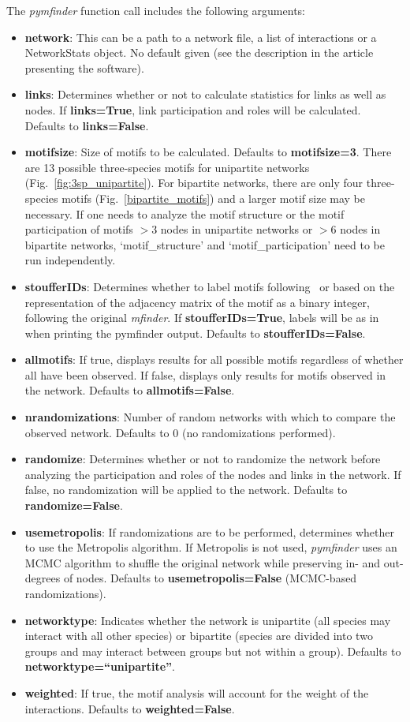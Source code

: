 \documentclass[12pt]{article}
\begin{document}
			The \emph{pymfinder} function call includes the following arguments:
     	\begin{itemize}
     		\item \textbf{network}: This can be a path to a network file, a list of interactions or a NetworkStats object. No default given (see the description in the article presenting the software).
				\item \textbf{links}: Determines whether or not to calculate statistics for links as well as nodes. If \textbf{links=True}, link participation and roles will be calculated. Defaults to \textbf{links=False}.
				\item \textbf{motifsize}: Size of motifs to be calculated. Defaults to \textbf{motifsize=3}. There are 13 possible three-species motifs for unipartite networks (Fig.~\ref{fig:3sp_unipartite}). For bipartite networks, there are only four three-species motifs (Fig.~\ref{bipartite_motifs}) and a larger motif size may be necessary. If one needs to analyze the motif structure or the motif participation of motifs $>3$ nodes in unipartite networks or $>6$ nodes in bipartite networks, `motif\_structure' and `motif\_participation' need to be run independently.
				\item \textbf{stoufferIDs}: Determines whether to label motifs following~\citet{Stouffer2007} or based on the representation of the adjacency matrix of the motif as a binary integer, following the original \emph{mfinder}. If \textbf{stoufferIDs=True}, labels will be as in~\citet{Stouffer2007} when printing the pymfinder output. Defaults to \textbf{stoufferIDs=False}.
				\item \textbf{allmotifs}: If true, displays results for all possible motifs regardless of whether all have been observed. If false, displays only results for motifs observed in the network. Defaults to \textbf{allmotifs=False}.
				\item \textbf{nrandomizations}: Number of random networks with which to compare the observed network. Defaults to 0 (no randomizations performed).
				\item \textbf{randomize}: Determines whether or not to randomize the network before analyzing the participation and roles of the nodes and links in the network. If false, no randomization will be applied to the network. Defaults to \textbf{randomize=False}.
				\item \textbf{usemetropolis}: If randomizations are to be performed, determines whether to use the Metropolis algorithm. If Metropolis is not used, \emph{pymfinder} uses an MCMC algorithm to shuffle the original network while preserving in- and out-degrees of nodes. Defaults to \textbf{usemetropolis=False} (MCMC-based randomizations).
				\item \textbf{networktype}: Indicates whether the network is unipartite (all species may interact with all other species) or bipartite (species are divided into two groups and may interact between groups but not within a group). Defaults to \textbf{networktype=``unipartite''}.
				\item \textbf{weighted}: If true, the motif analysis will account for the weight of the interactions. Defaults to \textbf{weighted=False}.
			\end{itemize}
\end{document}
